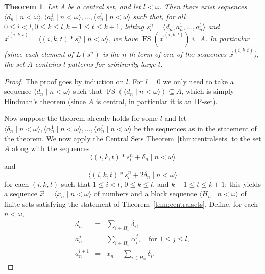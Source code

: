 \documentclass{amsart}
\newtheorem{theorem}{Theorem}[section]
\theoremstyle{definition}
\theoremstyle{remark}
\numberwithin{equation}{section}
\newcommand{\fs}{\mathop{\mathrm{FS}}}
\begin{document}
\begin{theorem}\label{thm:arbitrarilylong}
Let $A$ be a central set, and let $l<\omega$. Then there exist sequences $\langle d_n\mid n<\omega\rangle,\langle a_n^1\mid n<\omega\rangle,\ldots,\langle a_n^l\mid n<\omega\rangle$ such that, for all $0\leq i<l,0\leq k\leq l,k-1\leq t\leq k+1$, letting $s_l^n=\langle d_n,a_n^1,\ldots,a_n^l\rangle$ and $\vec{x}^{(i,k,t)}=\langle (i,k,t)*s_l^n\mid n<\omega\rangle$, we have $\fs(\vec{x}^{(i,k,t)})\subseteq A$. In particular (since each element of $L(s^n)$ is the $n$-th term of one of the sequences $\vec{x}^{(i,k,t)}$), the set $A$ contains $l$-patterns for arbitrarily large $l$.
\end{theorem}

\begin{proof}
The proof goes by induction on $l$. For $l=0$ we only need to take a sequence $\langle d_n\mid n<\omega\rangle$ such that $\fs(\langle d_n\mid n<\omega\rangle)\subseteq A$, which is simply Hindman's theorem (since $A$ is central, in particular it is an IP-set).

Now suppose the theorem already holds for some $l$ and let $\langle \delta_n\mid n<\omega\rangle,\langle \alpha_n^1\mid n<\omega\rangle,\ldots,\langle \alpha_n^l\mid n<\omega\rangle$ be the sequences as in the statement of the theorem. We now apply the Central Sets Theorem~\ref{thm:centralsets} to the set $A$ along with the sequences
\begin{equation*}
    \langle(i,k,t)*s_l^n+\delta_n\mid n<\omega\rangle
\end{equation*}
and
\begin{equation*}
    \langle(i,k,t)*s_l^n+2\delta_n\mid n<\omega\rangle
\end{equation*}
for each $(i,k,t)$ such that $1\leq i<l$, $0\leq k\leq l$, and $k-1\leq t\leq k+1$; this yields a sequence $\vec{x}=\langle x_n\mid n<\omega\rangle$ of numbers and a block sequence $\langle H_n\mid n<\omega\rangle$ of finite sets satisfying the statement of Theorem~\ref{thm:centralsets}. Define, for each $n<\omega$,
\begin{eqnarray*}
d_n & = & \sum_{i\in H_n}\delta_i, \\
a_n^j & = & \sum_{i\in H_n}\alpha_i^j, \ \ \ \text{ for }1\leq j\leq l, \\
a_n^{l+1} & = & x_n+\sum_{i\in H_n}\delta_i.
\end{eqnarray*}


\end{proof}
\end{document}
